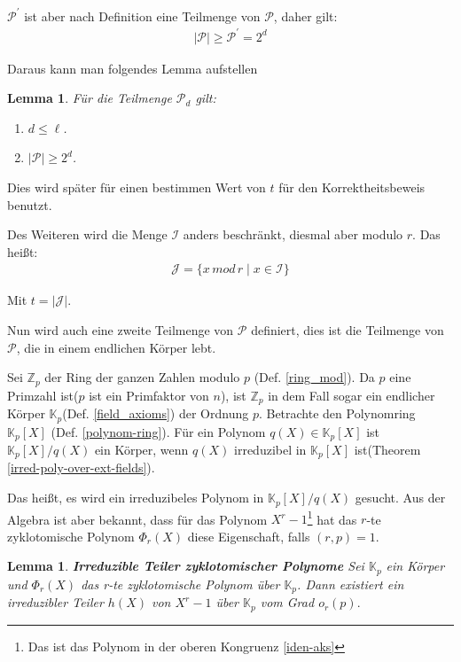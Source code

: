\documentclass[12pt,oneside]{article}
\newtheorem{lemma}[theorem]{Lemma}
\theoremstyle{remark}
\theoremstyle{definition}
\begin{document}
\begin{flushleft}
$\mathcal{P}^{'}$ ist aber nach Definition eine Teilmenge von $\mathcal{P}$, daher gilt:
\begin{align*}
    |\mathcal{P}| \geq \mathcal{P}^{'} = 2^d
\end{align*}

Daraus kann man folgendes Lemma aufstellen

\begin{lemma}\label{lemma-cond-3.5}
Für die Teilmenge $\mathcal{P}_d$ gilt:
\begin{enumerate}
    \item $d \leq \ell$.\newline
    
    \item $|\mathcal{P}| \geq 2^d$.
    
\end{enumerate}
\end{lemma}
Dies wird später für einen bestimmen Wert von $t$ für den Korrektheitsbeweis benutzt.\newline

Des Weiteren wird die Menge $\mathcal{I}$ anders beschränkt, diesmal aber modulo $r$. Das heißt:
\begin{align*}
    \mathcal{J} = \{ x \, mod \, r \mid x \in \mathcal{I} \}
\end{align*}

Mit $t = |\mathcal{J}|$.

Nun wird auch eine zweite Teilmenge von $\mathcal{P}$ definiert, dies ist die Teilmenge von $\mathcal{P}$, die in einem endlichen Körper lebt.

Sei $\mathbb{Z}_p$ der Ring der ganzen Zahlen modulo $p$ (Def. \ref{ring_mod}). Da $p$ eine Primzahl ist($p$ ist ein Primfaktor von $n$), ist $\mathbb{Z}_p$ in dem Fall sogar ein endlicher Körper $\mathbb{K}_p$(Def. \ref{field_axioms}) der Ordnung $p$. Betrachte den Polynomring $\mathbb{K}_p[X]$ (Def. \ref{polynom-ring}). Für ein Polynom $q(X) \in \mathbb{K}_p[X]$ ist $\mathbb{K}_p[X]/q(X)$ ein Körper, wenn $q(X)$ irreduzibel in $\mathbb{K}_p[X]$ ist(Theorem \ref{irred-poly-over-ext-fields}).

Das heißt, es wird  ein irreduzibeles Polynom in $\mathbb{K}_p[X]/q(X)$ gesucht. Aus der Algebra ist aber bekannt, dass für das Polynom $X^r - 1$\footnote{Das ist das Polynom in der oberen Kongruenz \ref{iden-aks}} hat das $r$-te zyklotomische Polynom $\Phi_{r}(X)$ diese Eigenschaft, falls $(r,p) = 1$.

\begin{lemma}\label{cyc_ov_fields}
\textbf{Irreduzible Teiler zyklotomischer Polynome}\newline
Sei $\mathbb{K}_{p}$ ein Körper und $\Phi_{r}(X)$ das r-te zyklotomische Polynom über $\mathbb{K}_{p}$. Dann existiert ein irreduzibler Teiler $h(X)$ von $X^r - 1$ über $\mathbb{K}_{p}$ vom Grad $o_{r}(p).$
\end{lemma}


\end{flushleft}
\end{document}
